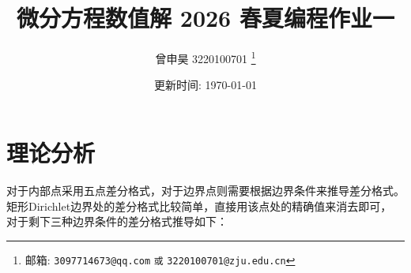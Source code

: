 \documentclass[a4paper]{article}
\begin{document}
\title{微分方程数值解 2026 春夏编程作业一}

\author{曾申昊 3220100701
  \thanks{邮箱: \texttt{3097714673@qq.com}
                            \texttt{或} \texttt{3220100701@zju.edu.cn}}}

\date{更新时间: \today}

\maketitle


\section{理论分析}

\par 对于内部点采用五点差分格式，对于边界点则需要根据边界条件来推导差分格式。
矩形Dirichlet边界处的差分格式比较简单，直接用该点处的精确值来消去即可，
对于剩下三种边界条件的差分格式推导如下：
\end{document}
